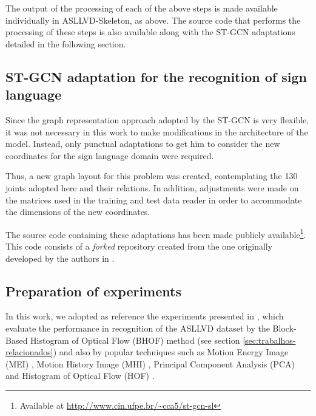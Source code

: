 The output of the processing of each of the above steps is made available individually in ASLLVD-Skeleton, as above. The source code that performs the processing of these steps is also available along with the ST-GCN adaptations detailed in the following section.


\subsection{ST-GCN adaptation for the recognition of sign language} 
\label{sec:adaptacao-st-gcn}

Since the graph representation approach adopted by the ST-GCN is very flexible, it was not necessary in this work to make modifications in the architecture of the model. Instead, only punctual adaptations to get him to consider the new coordinates for the sign language domain were required.

Thus, a new graph layout for this problem was created, contemplating the 130 joints adopted here and their relations. In addition, adjustments were made on the matrices used in the training and test data reader in order to accommodate the dimensions of the new coordinates.

The source code containing these adaptations has been made publicly available\footnote{
    Available at \url{http://www.cin.ufpe.br/~cca5/st-gcn-sl}
}. This code consists of a \textit{forked} repository created from the one originally developed by the authors in \cite{st-gcn-2018}.


\subsection{Preparation of experiments} 
\label{experimentos}

In this work, we adopted as reference the experiments presented in \cite{lim-2016}, which evaluate the performance in recognition of the ASLLVD dataset by the Block-Based Histogram of Optical Flow (BHOF) method (see section \ref{sec:trabalhos-relacionados}) and also by popular techniques such as Motion Energy Image (MEI) \cite{athitsos-asllvd-2008}, Motion History Image (MHI) \cite{babu-2004}, Principal Component Analysis (PCA) \cite{dreuw-2012} and Histogram of Optical Flow (HOF) \cite{laptev-2008}.


